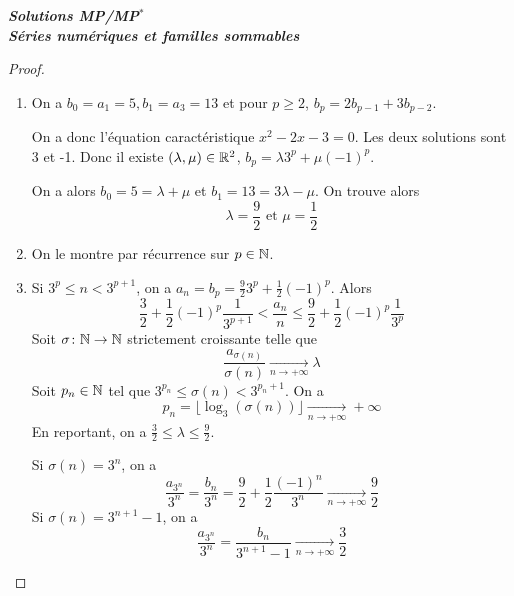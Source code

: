 \documentclass[12pt]{article}
\begin{document}
\begin{titlepage}
	\centering
	\vspace*{\fill}
	\Huge \textit{\textbf{Solutions MP/MP$^*$\\ Séries numériques et familles sommables}}
	\vspace*{\fill}
\end{titlepage}

\begin{proof}
	\phantom{}
	\begin{enumerate}
		\item On a $b_{0}=a_{1}=5,b_{1}=a_{3}=13$ et pour $p\geqslant2$, $b_{p}=2b_{p-1}+3b_{p-2}$.
		
		On a donc l'équation caractéristique $x^{2}-2x-3=0$. Les deux solutions sont 3 et -1. Donc il existe $(\lambda,\mu)\in\mathbb{R}^{2}$, $b_{p}=\lambda 3^{p}+\mu(-1)^{p}$.

		On a alors $b_{0}=5=\lambda+\mu$ et $b_{1}=13=3\lambda-\mu$. On trouve alors 
		\begin{equation*}
			\boxed{\lambda=\frac{9}{2} \text{ et } \mu=\frac{1}{2}}
		\end{equation*}

		\item On le montre par récurrence sur $p\in\mathbb{N}$.
		
		\item Si $3^{p}\leqslant n<3^{p+1}$, on a $a_{n}=b_{p}=\frac{9}{2}3^{p}+\frac{1}{2}(-1)^{p}$.
		Alors 
		\begin{equation*}\frac{3}{2}+\frac{1}{2}(-1)^{p}\frac{1}{3^{p+1}}<\frac{a_{n}}{n}\leqslant\frac{9}{2}+\frac{1}{2}(-1)^{p}\frac{1}{3^{p}}\end{equation*}
		Soit $\sigma\colon\mathbb{N}\to\mathbb{N}$ strictement croissante telle que 
		\begin{equation*}\frac{a_{\sigma(n)}}{\sigma(n)}\xrightarrow[n\to+\infty]{}\lambda\end{equation*}
		Soit $p_{n}\in\mathbb{N}$ tel que $3^{p_{n}}\leqslant\sigma(n)<3^{p_{n}+1}$. On a 
		\begin{equation*}p_{n}=\bigl\lfloor\log_{3}(\sigma(n))\bigr\rfloor\xrightarrow[n\to+\infty]{}+\infty\end{equation*}
		En reportant, on a $\frac{3}{2}\leqslant\lambda\leqslant\frac{9}{2}$.

		Si $\sigma(n)=3^{n}$, on a 
		\begin{equation*}\frac{a_{3^{n}}}{3^{n}}=\frac{b_{n}}{3^{n}}=\frac{9}{2}+\frac{1}{2}\frac{(-1)^{n}}{3^{n}}\xrightarrow[n\to+\infty]{}\frac{9}{2}\end{equation*}
		Si $\sigma(n)=3^{n+1}-1$, on a 
		\begin{equation*}\frac{a_{3^{n}}}{3^{n}}=\frac{b_{n}}{3^{n+1}-1}\xrightarrow[n\to+\infty]{}\frac{3}{2}\end{equation*}


\end{enumerate}
\end{proof}
\end{document}
